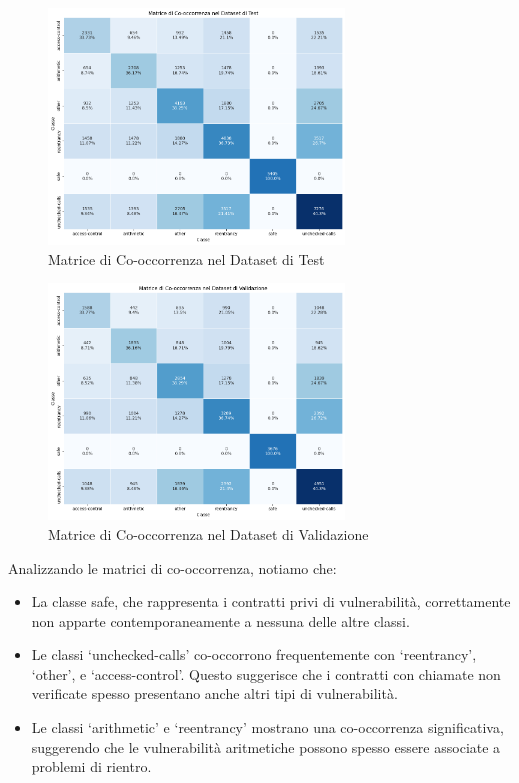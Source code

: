 \documentclass[../../Thesis.tex]{subfiles}
\begin{document}
\begin{figure}[H]
    \centering
    \includegraphics[width=0.7\textwidth]{../../img/TestCo-occurrency.png}
    \caption{Matrice di Co-occorrenza nel Dataset di Test}
    \label{fig:test_cooccurrence_matrix}
\end{figure}

\begin{figure}[h]
    \centering
    \includegraphics[width=0.7\textwidth]{../../img/ValCo-occurrency.png}
    \caption{Matrice di Co-occorrenza nel Dataset di Validazione}
    \label{fig:val_cooccurrence_matrix}
\end{figure}

Analizzando le matrici di co-occorrenza, notiamo che:

\begin{itemize}
    \item La classe safe, che rappresenta i contratti privi di vulnerabilit\`a, correttamente non apparte contemporaneamente a nessuna delle altre classi. 
    \item Le classi `unchecked-calls' co-occorrono frequentemente con `reentrancy', `other', e `access-control'. Questo suggerisce che i contratti con chiamate non verificate spesso presentano anche altri tipi di vulnerabilit\`a.
    \item Le classi `arithmetic' e `reentrancy' mostrano una co-occorrenza significativa, suggerendo che le vulnerabilit\`a aritmetiche possono spesso essere associate a problemi di rientro.
\end{itemize}
\end{document}
